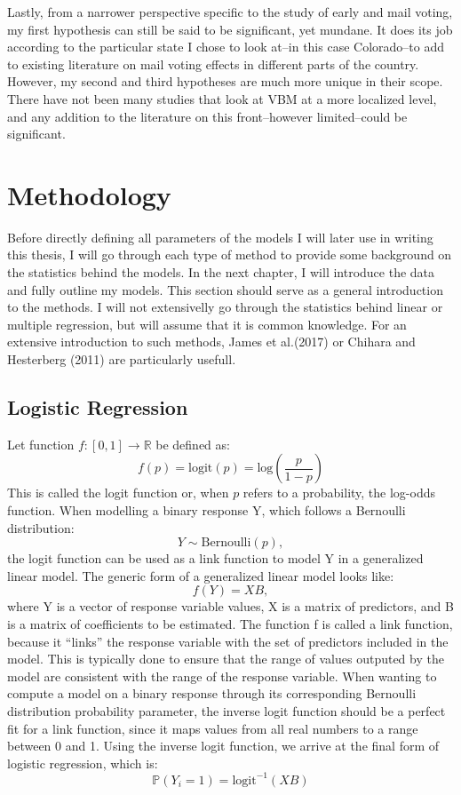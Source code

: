 \documentclass[12pt,twoside]{reedthesis}
\begin{document}
  Lastly, from a narrower perspective specific to the study of early and
  mail voting, my first hypothesis can still be said to be significant,
  yet mundane. It does its job according to the particular state I chose
  to look at--in this case Colorado--to add to existing literature on mail
  voting effects in different parts of the country. However, my second and
  third hypotheses are much more unique in their scope. There have not
  been many studies that look at VBM at a more localized level, and any
  addition to the literature on this front--however limited--could be
  significant.
  
  \section{Methodology}\label{methodology}
  
  Before directly defining all parameters of the models I will later use
  in writing this thesis, I will go through each type of method to provide
  some background on the statistics behind the models. In the next
  chapter, I will introduce the data and fully outline my models. This
  section should serve as a general introduction to the methods. I will
  not extensivelly go through the statistics behind linear or multiple
  regression, but will assume that it is common knowledge. For an
  extensive introduction to such methods, James et al.(2017) or Chihara
  and Hesterberg (2011) are particularly usefull.
  
  \subsection{Logistic Regression}\label{logistic-regression}
  
  Let function \(f : [0, 1] \to \mathbb{R}\) be defined as:
  \[f(p) = \text{logit}(p) = \text{log}\left( \frac{p}{1-p} \right)\] This
  is called the logit function or, when \(p\) refers to a probability, the
  log-odds function. When modelling a binary response Y, which follows a
  Bernoulli distribution: \[Y \sim \text{Bernoulli}(p),\] the logit
  function can be used as a link function to model Y in a generalized
  linear model. The generic form of a generalized linear model looks
  like:\\
  \[f(Y) = XB,\] where Y is a vector of response variable values, X is a
  matrix of predictors, and B is a matrix of coefficients to be estimated.
  The function f is called a link function, because it ``links'' the
  response variable with the set of predictors included in the model. This
  is typically done to ensure that the range of values outputed by the
  model are consistent with the range of the response variable. When
  wanting to compute a model on a binary response through its
  corresponding Bernoulli distribution probability parameter, the inverse
  logit function should be a perfect fit for a link function, since it
  maps values from all real numbers to a range between 0 and 1. Using the
  inverse logit function, we arrive at the final form of logistic
  regression, which is:\\
  \[\mathbb{P} (Y_i = 1) = \text{logit}^{-1} (XB)\]
  
\end{document}
